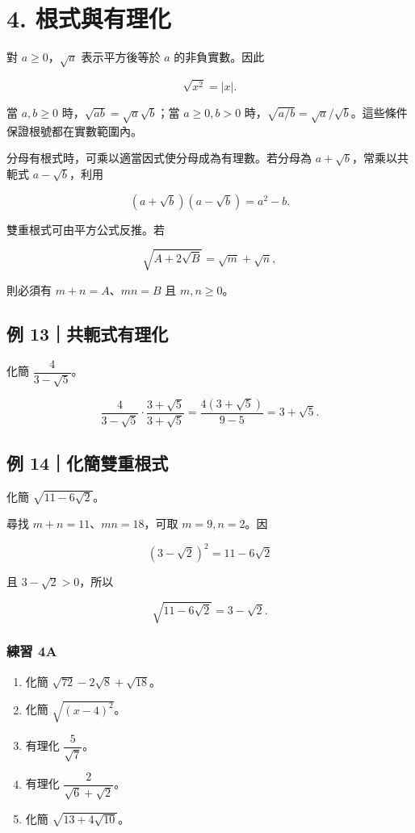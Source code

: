 \documentclass[11pt,a4paper]{article}
\providecommand{\tightlist}{%
  \setlength{\itemsep}{0pt}\setlength{\parskip}{0pt}}
\begin{document}
\section{4. 根式與有理化}\label{ux6839ux5f0fux8207ux6709ux7406ux5316}

對 \(a\ge0\)，\(\sqrt a\) 表示平方後等於 \(a\) 的非負實數。因此

\[
\boxed{\sqrt{x^2}=|x|}.
\]

當 \(a,b\ge0\) 時，\(\sqrt{ab}=\sqrt a\sqrt b\)；當 \(a\ge0,b>0\) 時，\(\sqrt{a/b}=\sqrt a/\sqrt b\)。這些條件保證根號都在實數範圍內。

分母有根式時，可乘以適當因式使分母成為有理數。若分母為 \(a+\sqrt b\)，常乘以共軛式 \(a-\sqrt b\)，利用

\[
(a+\sqrt b)(a-\sqrt b)=a^2-b.
\]

雙重根式可由平方公式反推。若

\[
\sqrt{A+2\sqrt B}=\sqrt m+\sqrt n,
\]

則必須有 \(m+n=A\)、\(mn=B\) 且 \(m,n\ge0\)。

\subsection{例 13｜共軛式有理化}\label{ux4f8b-13ux5171ux8edbux5f0fux6709ux7406ux5316}

化簡 \(\dfrac4{3-\sqrt5}\)。

\[
\frac4{3-\sqrt5}\cdot\frac{3+\sqrt5}{3+\sqrt5}
=\frac{4(3+\sqrt5)}{9-5}
=\boxed{3+\sqrt5}.
\]

\subsection{例 14｜化簡雙重根式}\label{ux4f8b-14ux5316ux7c21ux96d9ux91cdux6839ux5f0f}

化簡 \(\sqrt{11-6\sqrt2}\)。

尋找 \(m+n=11\)、\(mn=18\)，可取 \(m=9,n=2\)。因

\[
(3-\sqrt2)^2=11-6\sqrt2
\]

且 \(3-\sqrt2>0\)，所以

\[
\sqrt{11-6\sqrt2}=\boxed{3-\sqrt2}.
\]

\subsubsection{練習 4A}\label{ux7df4ux7fd2-4a}

\begin{enumerate}
\def\labelenumi{\arabic{enumi}.}
\tightlist
\item
  化簡 \(\sqrt{72}-2\sqrt8+\sqrt{18}\)。
\item
  化簡 \(\sqrt{(x-4)^2}\)。
\item
  有理化 \(\dfrac5{\sqrt7}\)。
\item
  有理化 \(\dfrac2{\sqrt6+\sqrt2}\)。
\item
  化簡 \(\sqrt{13+4\sqrt{10}}\)。
\end{enumerate}
\end{document}
